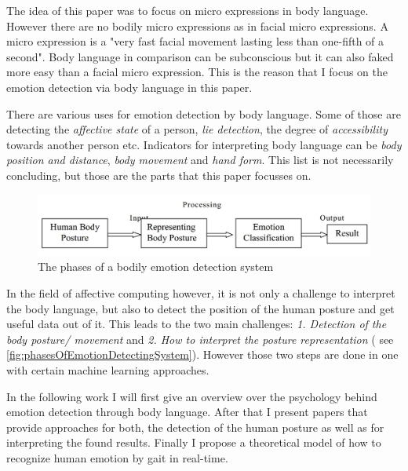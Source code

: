 \documentclass[conference]{IEEEtran}
\begin{document}
The idea of this paper was to focus on micro expressions in body language. However there are no bodily micro expressions as in facial micro expressions. A micro expression is a "very fast facial movement lasting less than one-fifth of a second"\cite{eckman2003emotions}. Body language in comparison can be subconscious but it can also faked more easy than a facial micro expression. This is the reason that I focus on the emotion detection via body language in this paper.

There are various uses for emotion detection by body language. Some of those are detecting the \emph{affective state} of a person, \emph{lie detection}, the degree of \emph{accessibility} towards another person etc. Indicators for interpreting body language can be \emph{body position and distance}\cite{mccoll2012affect,mehrabian1969significance}, \emph{body movement}\cite{singhsignificance,karg2012pattern} and \emph{hand form}\cite{wang2007hand,triesch2001system}. This list is not necessarily concluding, but those are the parts that this paper focusses on.

\begin{figure}[H]
\centering
   \includegraphics[width=\linewidth]{phasesOfEmotionDetectingSystem.jpg}
  \caption{The phases of a bodily emotion detection system\cite{singhsignificance}}
  \label{fig:phasesOfEmotionDetectingSystem}
\end{figure}


In the field of affective computing however, it is not only a challenge to interpret the body language, but also to detect the position of the human posture and get useful data out of it. This leads to the two main challenges: \emph{1. Detection of the body posture/ movement} and \emph{2. How to interpret the posture representation} ( see \autoref{fig:phasesOfEmotionDetectingSystem}\cite{singhsignificance}). However those two steps are done in one with certain machine learning approaches\cite{schindler2008recognizing, kleinsmith2007recognizing, kleinsmith2005incremental}.

In the following work I will first give an overview over the psychology behind emotion detection through body language. After that I present papers that provide approaches for both, the detection of the human posture as well as for interpreting the found results. Finally I propose a theoretical model of how to recognize human emotion by gait in real-time. 
\end{document}
